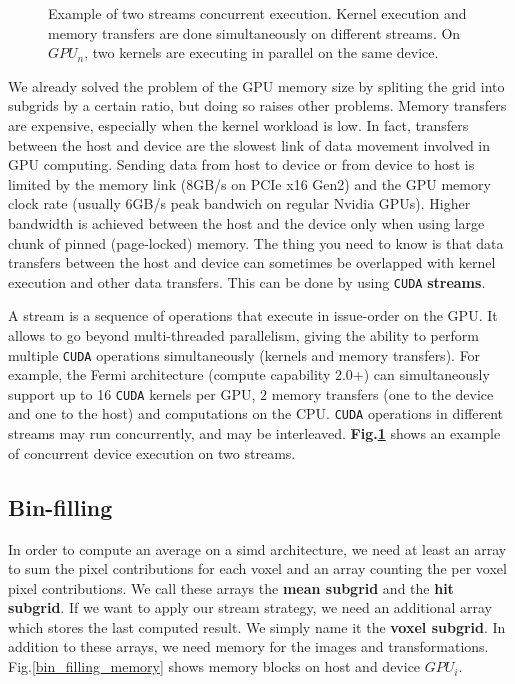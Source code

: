 \documentclass[12pt,journal,compsoc]{IEEEtran}
\begin{document}
\begin{figure}[!ht]
\centering
{}
\caption{Example of two streams concurrent execution. Kernel execution and memory transfers are done simultaneously on different streams. On $GPU_n$, two kernels are executing in parallel on the same device.}
\label{basic_streams}
\end{figure}


We already solved the problem of the GPU memory size by spliting the grid into subgrids by a certain ratio, but doing so raises other problems.
Memory transfers are expensive, especially when the kernel workload is low.
In fact, transfers between the host and device are the slowest link of data movement involved in GPU computing.
Sending data from host to device or from device to host is limited by the memory link (8GB/s on PCIe x16 Gen2) and the GPU memory clock rate (usually 6GB/s peak bandwich on regular Nvidia GPUs).
Higher bandwidth is achieved between the host and the device only when using large chunk of pinned (page-locked) memory.
The thing you need to know is that data transfers between the host and device can sometimes be overlapped with kernel execution and other data transfers.
This can be done by using \texttt{CUDA} \textbf{streams}.\par
A stream is a sequence of operations that execute in issue-order on the GPU.
It allows to go beyond multi-threaded parallelism, giving the ability to perform multiple \texttt{CUDA} operations simultaneously (kernels and memory transfers).
For example, the Fermi architecture (compute capability 2.0+) can simultaneously support up to 16 \texttt{CUDA} kernels per GPU, 2 memory transfers (one to the device and one to the host) and computations on the CPU.
\texttt{CUDA} operations in different streams may run concurrently, and may be interleaved. \textbf{Fig.\ref{basic_streams}} shows an example of concurrent device execution on two streams.

\subsection{Bin-filling}
In order to compute an average on a \ac{simd} architecture, we need at least an array to sum the pixel contributions for each voxel and an array counting the per voxel pixel contributions.
We call these arrays the \textbf{mean subgrid} and the \textbf{hit subgrid}.
If we want to apply our stream strategy, we need an additional array which stores the last computed result.
We simply name it the \textbf{voxel subgrid}. 
In addition to these arrays, we need memory for the images and transformations.
Fig.\ref{bin_filling_memory} shows memory blocks on host and device $GPU_i$.
\end{document}
